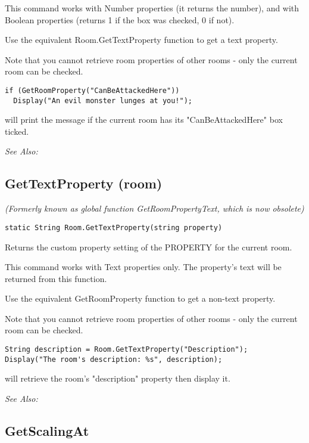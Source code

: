 This command works with Number properties (it returns the number), and with Boolean
properties (returns 1 if the box was checked, 0 if not).

Use the equivalent Room.GetTextProperty function to get a text property.

Note that you cannot retrieve room properties of other rooms - only the current room
can be checked.

\begin{verbatim}
if (GetRoomProperty("CanBeAttackedHere"))
  Display("An evil monster lunges at you!");
\end{verbatim}
will print the message if the current room has its "CanBeAttackedHere" box ticked.

\it{See Also:} 


\subsection{GetTextProperty (room)}\label{Room.GetTextProperty}%

\it{(Formerly known as global function GetRoomPropertyText, which is now obsolete)}

\begin{verbatim}
static String Room.GetTextProperty(string property)
\end{verbatim}
Returns the custom property setting of the PROPERTY for the current room.

This command works with Text properties only. The property's text will be
returned from this function.

Use the equivalent GetRoomProperty function to get a non-text property.

Note that you cannot retrieve room properties of other rooms - only the current room
can be checked.

\begin{verbatim}
String description = Room.GetTextProperty("Description");
Display("The room's description: %s", description);
\end{verbatim}
will retrieve the room's "description" property then display it.

\it{See Also:} 


\subsection{GetScalingAt}\label{GetScalingAt}%

